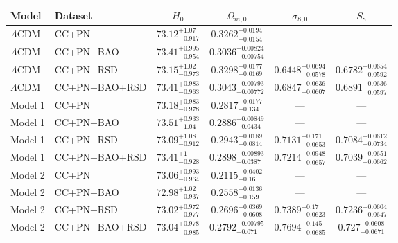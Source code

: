 \begin{tabular}{llcccc}
\hline
Model & Dataset & $H_0$ & $\Omega_{m,0}$ & $\sigma_{8,0}$ & $S_8$ \\
\hline
$\Lambda$CDM & CC+PN & $73.12^{+1.07}_{-0.917}$ & $0.3262^{+0.0194}_{-0.0154}$ & — & — \\
$\Lambda$CDM & CC+PN+BAO & $73.41^{+0.995}_{-0.954}$ & $0.3036^{+0.00824}_{-0.00754}$ & — & — \\
$\Lambda$CDM & CC+PN+RSD & $73.15^{+1.02}_{-0.973}$ & $0.3298^{+0.0177}_{-0.0169}$ & $0.6448^{+0.0694}_{-0.0578}$ & $0.6782^{+0.0654}_{-0.0592}$ \\
$\Lambda$CDM & CC+PN+BAO+RSD & $73.41^{+0.983}_{-0.963}$ & $0.3043^{+0.00793}_{-0.00772}$ & $0.6847^{+0.0636}_{-0.0607}$ & $0.6891^{+0.0636}_{-0.0597}$ \\
Model 1 & CC+PN & $73.18^{+0.983}_{-0.978}$ & $0.2817^{+0.0177}_{-0.134}$ & — & — \\
Model 1 & CC+PN+BAO & $73.51^{+0.933}_{-1.04}$ & $0.2886^{+0.00849}_{-0.0434}$ & — & — \\
Model 1 & CC+PN+RSD & $73.09^{+1.08}_{-0.912}$ & $0.2943^{+0.0189}_{-0.0814}$ & $0.7131^{+0.171}_{-0.0653}$ & $0.7084^{+0.0612}_{-0.0734}$ \\
Model 1 & CC+PN+BAO+RSD & $73.41^{+1}_{-0.928}$ & $0.2898^{+0.00893}_{-0.0387}$ & $0.7214^{+0.0948}_{-0.0657}$ & $0.7039^{+0.0651}_{-0.0662}$ \\
Model 2 & CC+PN & $73.06^{+0.993}_{-0.964}$ & $0.2115^{+0.0402}_{-0.16}$ & — & — \\
Model 2 & CC+PN+BAO & $72.98^{+1.02}_{-0.937}$ & $0.2558^{+0.0136}_{-0.159}$ & — & — \\
Model 2 & CC+PN+RSD & $73.02^{+0.972}_{-0.977}$ & $0.2696^{+0.0369}_{-0.0608}$ & $0.7389^{+0.17}_{-0.0623}$ & $0.7236^{+0.0604}_{-0.0647}$ \\
Model 2 & CC+PN+BAO+RSD & $73.04^{+0.978}_{-0.985}$ & $0.2792^{+0.00795}_{-0.071}$ & $0.7694^{+0.145}_{-0.0685}$ & $0.727^{+0.0608}_{-0.0671}$ \\
\hline
\end{tabular}

